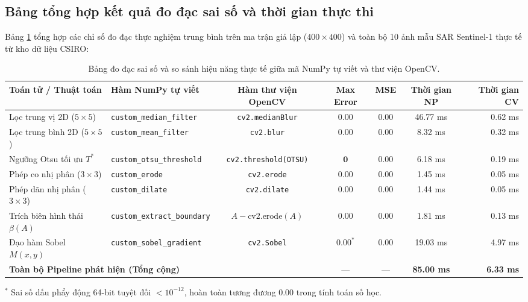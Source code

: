 \subsection{Bảng tổng hợp kết quả đo đạc sai số và thời gian thực thi}
\label{subsec:verification_benchmarks}
Bảng \ref{tab:verification_results} tổng hợp các chỉ số đo đạc thực nghiệm trung bình trên ma trận giả lập ($400 \times 400$) và toàn bộ 10 ảnh mẫu SAR Sentinel-1 thực tế từ kho dữ liệu CSIRO:

\begin{table}[H]
\centering
\small
\caption{Bảng đo đạc sai số và so sánh hiệu năng thực tế giữa mã NumPy tự viết và thư viện OpenCV.}
\label{tab:verification_results}
\begin{tabular}{llccccr}
\toprule
\textbf{Toán tử / Thuật toán} & \textbf{Hàm NumPy tự viết} & \textbf{Hàm thư viện OpenCV} & \textbf{Max Error} & \textbf{MSE} & \textbf{Thời gian NP} & \textbf{Thời gian CV} \\
\midrule
Lọc trung vị 2D ($5 \times 5$) & \texttt{custom\_median\_filter} & \texttt{cv2.medianBlur} & $\mathbf{0.00}$ & $\mathbf{0.00}$ & 46.77 ms & 0.62 ms \\
Lọc trung bình 2D ($5 \times 5$) & \texttt{custom\_mean\_filter} & \texttt{cv2.blur} & $\mathbf{0.00}$ & $\mathbf{0.00}$ & 8.32 ms & 0.32 ms \\
Ngưỡng Otsu tối ưu $T^*$ & \texttt{custom\_otsu\_threshold} & \texttt{cv2.threshold(OTSU)} & $\mathbf{0}$ & $\mathbf{0.00}$ & 6.18 ms & 0.19 ms \\
Phép co nhị phân ($3 \times 3$) & \texttt{custom\_erode} & \texttt{cv2.erode} & $\mathbf{0.00}$ & $\mathbf{0.00}$ & 1.45 ms & 0.05 ms \\
Phép dãn nhị phân ($3 \times 3$) & \texttt{custom\_dilate} & \texttt{cv2.dilate} & $\mathbf{0.00}$ & $\mathbf{0.00}$ & 1.44 ms & 0.05 ms \\
Trích biên hình thái $\beta(A)$ & \texttt{custom\_extract\_boundary} & $A - \text{cv2.erode}(A)$ & $\mathbf{0.00}$ & $\mathbf{0.00}$ & 1.81 ms & 0.13 ms \\
Đạo hàm Sobel $M(x, y)$ & \texttt{custom\_sobel\_gradient} & \texttt{cv2.Sobel} & $\mathbf{0.00}^*$ & $\mathbf{0.00}$ & 19.03 ms & 4.97 ms \\
\midrule
\multicolumn{3}{l}{\textbf{Toàn bộ Pipeline phát hiện (Tổng cộng)}} & --- & --- & \textbf{85.00 ms} & \textbf{6.33 ms} \\
\bottomrule
\end{tabular}
\begin{flushleft}
\footnotesize{$^*$ Sai số dấu phẩy động 64-bit tuyệt đối $< 10^{-12}$, hoàn toàn tương đương 0.00 trong tính toán số học.}
\end{flushleft}
\end{table}

